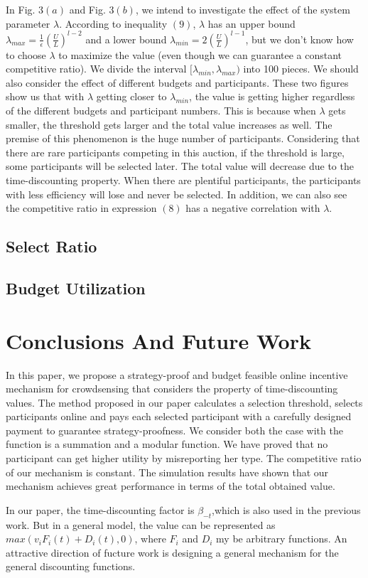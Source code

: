 \documentclass[conference,compsocconf,letterpaper,10pt]{IEEEtran}
\begin{document}
In Fig. $3(a)$ and Fig. $3(b)$, we intend to investigate the effect of the system parameter $\lambda$. According to inequality $(9)$, $\lambda$ has an upper bound $\lambda_{max}= \frac{1}{\epsilon}\left(\frac{U}{L}\right)^{l-2}$ and a lower bound $\lambda_{min}=2\left(\frac{U}{L}\right)^{l-1}$, but we don't know how to choose $\lambda$ to maximize the value (even though we can  guarantee a constant competitive ratio). We divide the interval $[\lambda_{min}, \lambda_{max})$ into 100 pieces. We should also consider the effect of different budgets and participants. These two figures show us that with  $\lambda$ getting closer to $\lambda_{min}$, the value is getting higher regardless of the different budgets and participant numbers. This is because when $\lambda$ gets smaller, the threshold gets larger and the total value increases as well. The premise of this phenomenon is the huge number of participants. Considering that there are rare participants competing in this auction, if the threshold is large, some participants will be selected later. The total value will decrease due to the time-discounting property. When there are plentiful participants, the participants with less efficiency will lose and never be selected. In addition, we can also see the competitive ratio in expression $(8)$ has a negative correlation with $\lambda$.
\subsection{Select Ratio}
\subsection{Budget Utilization}




\section{Conclusions And Future Work}
In this paper, we propose a strategy-proof and budget feasible online incentive mechanism for crowdsensing that considers the property of time-discounting values. The method proposed in our paper calculates a selection threshold, selects participants online and pays each selected participant with a carefully designed payment to guarantee strategy-proofness. We consider both the case with the function is a summation and a modular function. We have proved that no participant can get higher utility by misreporting her type. The competitive ratio of our mechanism is constant. The simulation results have shown that our mechanism achieves great performance in terms of the total obtained value.

In our paper, the time-discounting factor is $\beta_{-t}$,which is also used in the previous work. But in a general model, the value can be represented as $max(v_iF_i(t)+D_i(t),0)$, where $F_i$ and $D_i$ my be arbitrary functions. An attractive direction of fucture work is designing a general mechanism for the general discounting functions.


\end{document}
